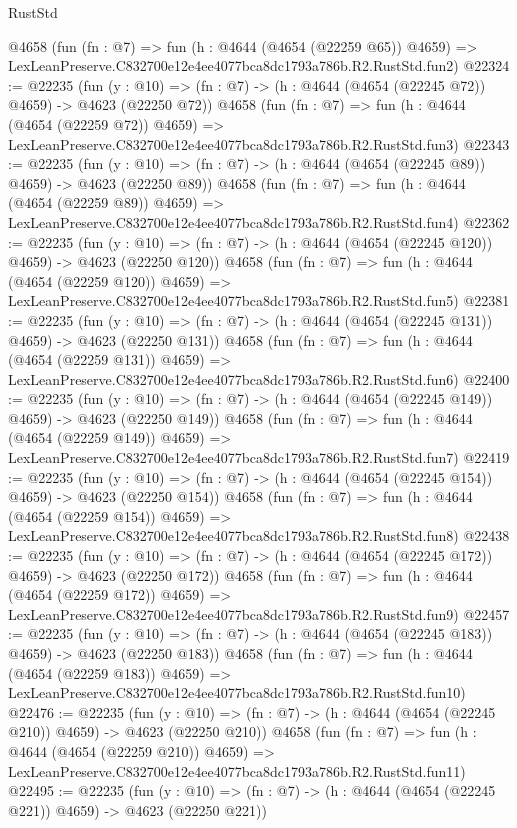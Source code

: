 \begin{lexlean}{RustStd}
\begin{coremodule}
    @4658
    (fun (fn : @7) =>
    fun (h : @4644 (@4654 (@22259 @65)) @4659) =>
    LexLeanPreserve.C832700e12e4ee4077bca8dc1793a786b.R2.RustStd.fun2)
@22324 := @22235
    (fun (y : @10) => (fn : @7) -> (h : @4644 (@4654 (@22245 @72)) @4659) -> @4623 (@22250 @72))
    @4658
    (fun (fn : @7) =>
    fun (h : @4644 (@4654 (@22259 @72)) @4659) =>
    LexLeanPreserve.C832700e12e4ee4077bca8dc1793a786b.R2.RustStd.fun3)
@22343 := @22235
    (fun (y : @10) => (fn : @7) -> (h : @4644 (@4654 (@22245 @89)) @4659) -> @4623 (@22250 @89))
    @4658
    (fun (fn : @7) =>
    fun (h : @4644 (@4654 (@22259 @89)) @4659) =>
    LexLeanPreserve.C832700e12e4ee4077bca8dc1793a786b.R2.RustStd.fun4)
@22362 := @22235
    (fun (y : @10) => (fn : @7) -> (h : @4644 (@4654 (@22245 @120)) @4659) -> @4623 (@22250 @120))
    @4658
    (fun (fn : @7) =>
    fun (h : @4644 (@4654 (@22259 @120)) @4659) =>
    LexLeanPreserve.C832700e12e4ee4077bca8dc1793a786b.R2.RustStd.fun5)
@22381 := @22235
    (fun (y : @10) => (fn : @7) -> (h : @4644 (@4654 (@22245 @131)) @4659) -> @4623 (@22250 @131))
    @4658
    (fun (fn : @7) =>
    fun (h : @4644 (@4654 (@22259 @131)) @4659) =>
    LexLeanPreserve.C832700e12e4ee4077bca8dc1793a786b.R2.RustStd.fun6)
@22400 := @22235
    (fun (y : @10) => (fn : @7) -> (h : @4644 (@4654 (@22245 @149)) @4659) -> @4623 (@22250 @149))
    @4658
    (fun (fn : @7) =>
    fun (h : @4644 (@4654 (@22259 @149)) @4659) =>
    LexLeanPreserve.C832700e12e4ee4077bca8dc1793a786b.R2.RustStd.fun7)
@22419 := @22235
    (fun (y : @10) => (fn : @7) -> (h : @4644 (@4654 (@22245 @154)) @4659) -> @4623 (@22250 @154))
    @4658
    (fun (fn : @7) =>
    fun (h : @4644 (@4654 (@22259 @154)) @4659) =>
    LexLeanPreserve.C832700e12e4ee4077bca8dc1793a786b.R2.RustStd.fun8)
@22438 := @22235
    (fun (y : @10) => (fn : @7) -> (h : @4644 (@4654 (@22245 @172)) @4659) -> @4623 (@22250 @172))
    @4658
    (fun (fn : @7) =>
    fun (h : @4644 (@4654 (@22259 @172)) @4659) =>
    LexLeanPreserve.C832700e12e4ee4077bca8dc1793a786b.R2.RustStd.fun9)
@22457 := @22235
    (fun (y : @10) => (fn : @7) -> (h : @4644 (@4654 (@22245 @183)) @4659) -> @4623 (@22250 @183))
    @4658
    (fun (fn : @7) =>
    fun (h : @4644 (@4654 (@22259 @183)) @4659) =>
    LexLeanPreserve.C832700e12e4ee4077bca8dc1793a786b.R2.RustStd.fun10)
@22476 := @22235
    (fun (y : @10) => (fn : @7) -> (h : @4644 (@4654 (@22245 @210)) @4659) -> @4623 (@22250 @210))
    @4658
    (fun (fn : @7) =>
    fun (h : @4644 (@4654 (@22259 @210)) @4659) =>
    LexLeanPreserve.C832700e12e4ee4077bca8dc1793a786b.R2.RustStd.fun11)
@22495 := @22235
    (fun (y : @10) => (fn : @7) -> (h : @4644 (@4654 (@22245 @221)) @4659) -> @4623 (@22250 @221))

\end{coremodule}
\end{lexlean}
